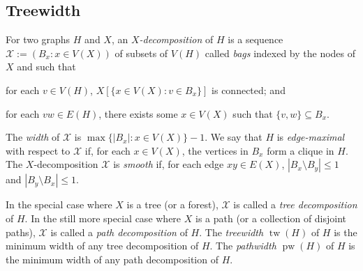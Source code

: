 \documentclass[kpfonts]{patmorin}
\DeclareMathOperator{\tw}{tw}
\DeclareMathOperator{\pw}{pw}
\theoremstyle{named}
\begin{document}



\subsection{Treewidth}

For two graphs $H$ and $X$, an \emph{$X$-decomposition} of $H$ is a sequence $\mathcal{X}:=(B_x:x\in V(X))$ of subsets of $V(H)$ called \emph{bags} indexed by the nodes of $X$ and such that
 \begin{inparaenum}[(i)]
     \item for each $v\in V(H)$, $X[\{x\in V(X):v\in B_x\}]$ is connected; and
     \item for each $vw\in E(H)$, there exists some $x\in V(X)$ such that $\{v,w\}\subseteq B_x$.
\end{inparaenum}
The \emph{width} of $\mathcal{X}$ is $\max\{|B_x|:x\in V(X)\}-1$. We say that $H$ is \emph{edge-maximal} with respect to $\mathcal{X}$ if, for each $x\in V(X)$, the vertices in $B_x$ form a clique in $H$. The $X$-decomposition $\mathcal{X}$ is \emph{smooth} if, for each edge $xy\in E(X)$, $|B_x\setminus B_y|\le 1$ and $|B_y\setminus B_x|\le 1$.

In the special case where $X$ is a tree (or a forest), $\mathcal{X}$ is called a \emph{tree decomposition} of $H$.  In the still more special case where $X$ is a path (or a collection of disjoint paths), $\mathcal{X}$ is called a \emph{path decomposition} of $H$. The \emph{treewidth} $\tw(H)$ of $H$ is the minimum width of any tree decomposition of $H$. The \emph{pathwidth} $\pw(H)$ of $H$ is the minimum width of any path decomposition of $H$.
\end{document}
